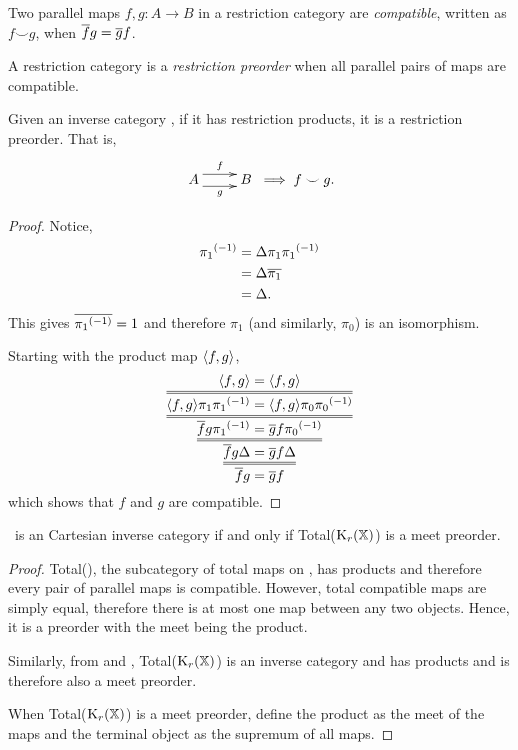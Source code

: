 \begin{definition}
  Two parallel maps $f,g:A \to B$ in a restriction category are \emph{compatible}, written as $f
  \smile g$, when $\overline{f} g = \overline{g} f$.
\end{definition}
\begin{definition}\label{def:restrictionpreorder}
  A restriction category \X is a \emph{restriction preorder} when all parallel pairs of maps are
  compatible.
\end{definition}
\begin{lemma}\label{lem:an_inverse_category_with_products_is_a_restriction_preorder}
  Given an inverse category \X, if it has restriction products, it is a restriction preorder. That
  is,
  \[
    \xymatrix {
      A  \ar@<1ex>[r]^{f} \ar@<-1ex>[r]_{g} &B
    } 
    \implies f \smile g.
  \]
\end{lemma}
\begin{proof}
  Notice,
  \begin{align*}
    {\pi_1}^{(-1)} & = \Delta \pi_1 {\pi_1}^{(-1)}\\
    &=\Delta \overline{\pi_1}\\
    &=\Delta.
  \end{align*}
  This gives $\overline{{\pi_1}^{(-1)}} = 1$ and therefore $\pi_1$ (and similarly, $\pi_0$) is an
  isomorphism.

  Starting with the product map $\langle f,g\rangle$,
  \[
    \infer={\restr{f}g = \restr{g}f}
    {\infer={\restr{f}g\Delta = \restr{g}f\Delta}
    {\infer={\restr{f}g\inv{\pi_1} = \restr{g}f\inv{\pi_0}}
    {\infer={\<f,g\>\pi_1 \inv{\pi_1} = \<f,g\>\pi_0 \inv{\pi_0}}
    {\<f,g\> = \<f,g\>}}}}
  \]
  which shows that $f$ and $g$ are compatible.
\end{proof}

\begin{corollary}
  \X\ is an Cartesian inverse category if and only if Total($\text{K}_{r}(\mathbb{X})$) is a meet preorder.
\end{corollary}

\begin{proof}
  Total(\X), the subcategory of total maps on \X, has products and therefore every pair of parallel
  maps is compatible. However, total compatible maps are simply equal, therefore there is at most
  one map between any two objects. Hence, it is a preorder with the meet being the product.

  Similarly, from \cite{cockett2002:restcategories1} and \cite{cockettlack2004:restcategories3},
  Total($\text{K}_{r}(\mathbb{X})$) is an inverse category and has products and is therefore also a meet
  preorder.

  When Total($\text{K}_{r}(\mathbb{X})$) is a meet preorder, define the product as the meet of the maps and the
  terminal object as the supremum of all maps.
\end{proof}

